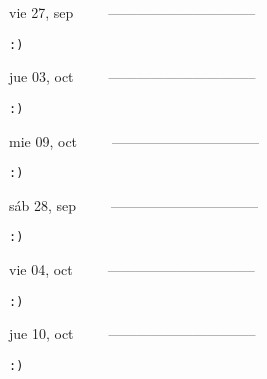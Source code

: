 \documentclass[letterpaper,10pt]{article}
\begin{document}
\begin{multicols}{3}
{vie 27, sep\ \ \ \ \ --------------------------------}
\begin{flushright}\begin{small}\texttt{:)}\end{small}\end{flushright}
\vfill
{jue 03, oct\ \ \ \ \ --------------------------------}
\begin{flushright}\begin{small}\texttt{:)}\end{small}\end{flushright}\par
\vfill
{mie 09, oct\ \ \ \ \ --------------------------------}
\begin{flushright}\begin{small}\texttt{:)}\end{small}\end{flushright}\par
\vfill
\end{multicols}
\vspace{1.05cm}

\begin{multicols}{3}
{sáb 28, sep\ \ \ \ \ --------------------------------}
\begin{flushright}\begin{small}\texttt{:)}\end{small}\end{flushright}
\vfill
{vie 04, oct\ \ \ \ \ --------------------------------}
\begin{flushright}\begin{small}\texttt{:)}\end{small}\end{flushright}\par
\vfill
{jue 10, oct\ \ \ \ \ --------------------------------}
\begin{flushright}\begin{small}\texttt{:)}\end{small}\end{flushright}\par
\vfill
\end{multicols}
\vspace{1.05cm}
\end{document}

